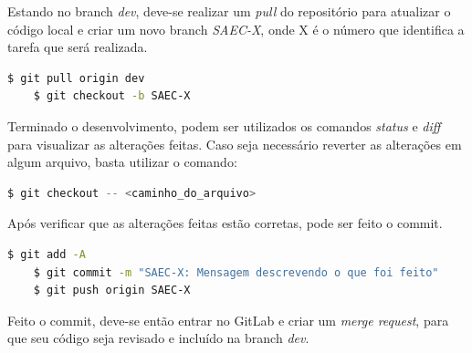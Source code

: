 Estando no branch \textit{dev}, deve-se realizar um \textit{pull} do repositório para atualizar o código local e criar um novo branch \textit{SAEC-X}, onde X é o número que identifica a tarefa que será realizada.

\begin{lstlisting}[language=bash]
    $ git pull origin dev
    $ git checkout -b SAEC-X
\end{lstlisting}

Terminado o desenvolvimento, podem ser utilizados os comandos \textit{status} e \textit{diff} para visualizar as alterações feitas. Caso seja necessário reverter as alterações em algum arquivo, basta utilizar o comando:

\begin{lstlisting}[language=bash]
    $ git checkout -- <caminho_do_arquivo>
\end{lstlisting}

Após verificar que as alterações feitas estão corretas, pode ser feito o commit.

\begin{lstlisting}[language=bash]
    $ git add -A
    $ git commit -m "SAEC-X: Mensagem descrevendo o que foi feito"
    $ git push origin SAEC-X
\end{lstlisting}

Feito o commit, deve-se então entrar no GitLab e criar um \textit{merge request}, para que seu código seja revisado e incluído na branch \textit{dev}.